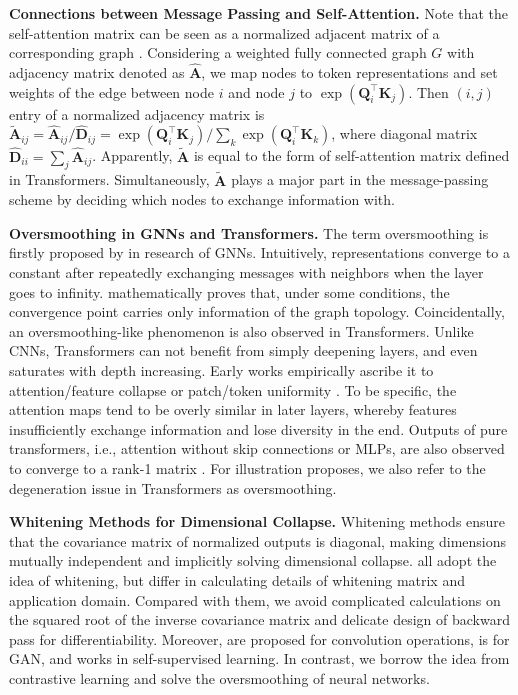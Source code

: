 \documentclass{article}
\def\mA{{\bm{A}}}
\def\mD{{\bm{D}}}
\def\mK{{\bm{K}}}
\def\mQ{{\bm{Q}}}
\theoremstyle{definition}
\theoremstyle{remark}
\theoremstyle{theorem}
\begin{document}
\textbf{Connections between Message Passing and Self-Attention.}
Note that the self-attention matrix can be seen as a normalized adjacent matrix of a corresponding graph \citep{shi2022revisiting}. Considering a weighted fully connected graph $G$ with adjacency matrix denoted as $\hat{\mA}$, we map nodes to token representations and set weights of the edge between node $i$ and node $j$ to $\exp({\mQ_i^{\top}\mK_j})$. Then $(i,j)$ entry of a normalized adjacency matrix is $\tilde{\mA}_{ij} = \hat{\mA}_{ij} / \hat{\mD}_{ij} = \exp({\mQ_i^{\top}\mK_j}) / \sum_k \exp(\mQ_i^{\top}\mK_k)$, where diagonal matrix $\hat{\mD}_{ii} = \sum_j\hat{\mA}_{ij}$. Apparently, $\tilde{\mA}$ is equal to the form of self-attention matrix defined in Transformers. Simultaneously, $\tilde{\mA}$ plays a major part in the message-passing scheme by deciding which nodes to exchange information with.

\textbf{Oversmoothing in GNNs and Transformers.} The term oversmoothing is firstly proposed by \citet{li2018deeper} in research of GNNs. Intuitively, representations converge to a constant after repeatedly exchanging messages with neighbors when the layer goes to infinity. \citet{zhou2020graph} mathematically proves that, under some conditions, the convergence point carries only information of the graph topology. Coincidentally, an oversmoothing-like phenomenon is also observed in Transformers. Unlike CNNs, Transformers can not benefit from simply deepening layers, and even saturates with depth increasing. Early works empirically ascribe it to attention/feature collapse or patch/token uniformity \citep{tang2021augmented, zhou2021deepvit, gong2021vision, yan2022addressing}. To be specific, the attention maps tend to be overly similar in later layers, whereby features insufficiently exchange information and lose diversity in the end. Outputs of pure transformers, i.e., attention without skip connections or MLPs, are also observed to converge to a rank-1 matrix \citep{dong2021attention}. For illustration proposes, we also refer to the degeneration issue in Transformers as oversmoothing. 

\textbf{Whitening Methods for Dimensional Collapse.} Whitening methods ensure that the covariance matrix of normalized outputs is diagonal, making dimensions mutually independent and implicitly solving dimensional collapse. \citet{huang2018decorrelated,huang2019iterative,siarohin2018whitening,ermolov2021whitening} all adopt the idea of whitening, but differ in calculating details of whitening matrix and application domain. Compared with them, we avoid complicated calculations on the squared root of the inverse covariance matrix and delicate design of backward pass for differentiability. Moreover, \citet{huang2018decorrelated,huang2019iterative} are proposed for convolution operations, \citet{siarohin2018whitening} is for GAN, and \citet{ermolov2021whitening} works in self-supervised learning. In contrast, we borrow the idea from contrastive learning and solve the oversmoothing of neural networks.
\end{document}
